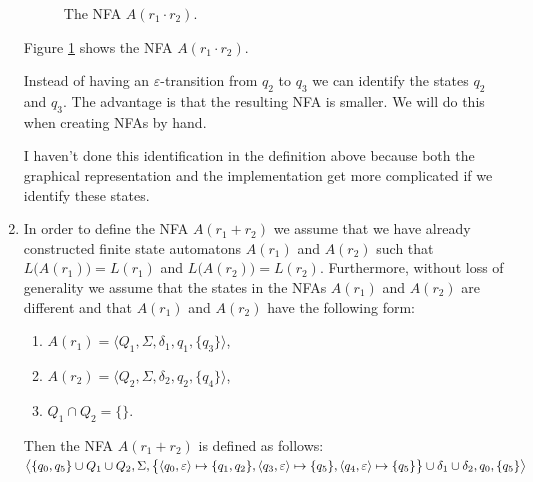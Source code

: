 \begin{enumerate}
      \begin{figure}[!ht]
        \centering
      \caption{The \textsc{NFA} $A(r_1 \cdot r_2)$.}
      \label{fig:aConcat.eps}
      \end{figure}
      Figure \ref{fig:aConcat.eps} shows the \textsc{NFA} $A(r_1 \cdot r_2)$.

      Instead of having an $\varepsilon$-transition from $q_2$ to $q_3$ we can identify the states $q_2$ and
      $q_3$.  The advantage is that the resulting \textsc{NFA} is smaller.
      We will do this when creating \textsc{NFA}s by hand.  

      I haven't done this identification in the definition above because both the graphical representation and 
      the implementation get more complicated if we identify these states.
\item In order to define the \textsc{NFA} $A(r_1 + r_2)$ we assume that we have already constructed finite
      state automatons $A(r_1)$ and $A(r_2)$ such that $L\bigl(A(r_1)\bigr) = L(r_1)$ and $L\bigl(A(r_2)\bigr) =
      L(r_2)$.  Furthermore, without loss of generality we assume that the states in the \textsc{NFA}s
      $A(r_1)$ and $A(r_2)$ are different and that $A(r_1)$ and $A(r_2)$ have the following form:
      \begin{enumerate}
      \item $A(r_1) = \bigl\langle Q_1, \Sigma, \delta_1, q_1, \{ q_3 \}\bigr\rangle$,
      \item $A(r_2) = \bigl\langle Q_2, \Sigma, \delta_2, q_2, \{ q_4 \}\bigr\rangle$,
      \item $Q_1 \cap Q_2 = \{\}$.
      \end{enumerate}
      Then the \textsc{NFA} $A(r_1 + r_2)$ is defined as follows:
      \\[0.2cm]
      \hspace*{0.8cm}
       $\bigl\langle \{ q_0, q_5 \} \cup Q_1 \cup Q_2, \Sigma, 
                \bigl\{ \pair(q_0,\varepsilon) \mapsto \{q_1, q_2\},
                   \pair(q_3,\varepsilon) \mapsto \{q_5\}, \pair(q_4,\varepsilon) \mapsto \{q_5\} \bigr\} 
                   \cup \delta_1 \cup \delta_2, q_0, \{ q_5 \} \bigr\rangle$


\end{enumerate}
